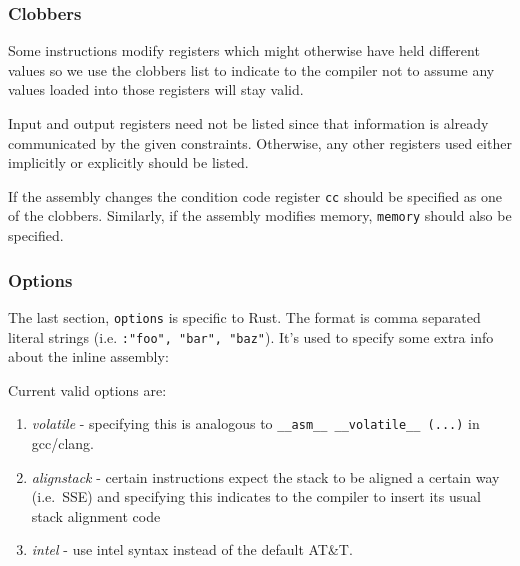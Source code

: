 \documentclass[a4paper,]{book}
\newenvironment{Shaded}{\begin{snugshade}}{\end{snugshade}}
\newcommand{\KeywordTok}[1]{\textcolor[rgb]{0.13,0.29,0.53}{\textbf{{#1}}}}
\newcommand{\DataTypeTok}[1]{\textcolor[rgb]{0.13,0.29,0.53}{{#1}}}
\newcommand{\StringTok}[1]{\textcolor[rgb]{0.31,0.60,0.02}{{#1}}}
\newcommand{\CommentTok}[1]{\textcolor[rgb]{0.56,0.35,0.01}{\textit{{#1}}}}
\newcommand{\PreprocessorTok}[1]{\textcolor[rgb]{0.56,0.35,0.01}{\textit{{#1}}}}
\newcommand{\NormalTok}[1]{{#1}}
\providecommand{\tightlist}{%
  \setlength{\itemsep}{0pt}\setlength{\parskip}{0pt}}
\begin{document}
\begin{Shaded}
\end{Shaded}

\subsubsection{Clobbers}\label{clobbers}

Some instructions modify registers which might otherwise have held
different values so we use the clobbers list to indicate to the compiler
not to assume any values loaded into those registers will stay valid.

\begin{Shaded}
\end{Shaded}

Input and output registers need not be listed since that information is
already communicated by the given constraints. Otherwise, any other
registers used either implicitly or explicitly should be listed.

If the assembly changes the condition code register \texttt{cc} should
be specified as one of the clobbers. Similarly, if the assembly modifies
memory, \texttt{memory} should also be specified.

\subsubsection{Options}\label{options}

The last section, \texttt{options} is specific to Rust. The format is
comma separated literal strings (i.e. \texttt{:"foo",\ "bar",\ "baz"}).
It's used to specify some extra info about the inline assembly:

Current valid options are:

\begin{enumerate}
\def\labelenumi{\arabic{enumi}.}
\tightlist
\item
  \emph{volatile} - specifying this is analogous to
  \texttt{\_\_asm\_\_\ \_\_volatile\_\_\ (...)} in gcc/clang.
\item
  \emph{alignstack} - certain instructions expect the stack to be
  aligned a certain way (i.e.~SSE) and specifying this indicates to the
  compiler to insert its usual stack alignment code
\item
  \emph{intel} - use intel syntax instead of the default AT\&T.
\end{enumerate}
\end{document}
